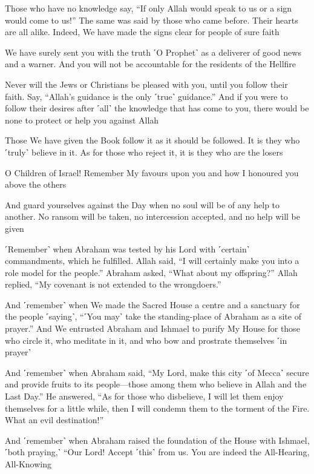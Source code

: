 Those who have no knowledge say, “If only Allah would speak to us or a sign would come to us!” The same was said by those who came before. Their hearts are all alike. Indeed, We have made the signs clear for people of sure faith

We have surely sent you with the truth ˹O Prophet˺ as a deliverer of good news and a warner. And you will not be accountable for the residents of the Hellfire

Never will the Jews or Christians be pleased with you, until you follow their faith. Say, “Allah’s guidance is the only ˹true˺ guidance.” And if you were to follow their desires after ˹all˺ the knowledge that has come to you, there would be none to protect or help you against Allah

Those We have given the Book follow it as it should be followed. It is they who ˹truly˺ believe in it. As for those who reject it, it is they who are the losers

O Children of Israel! Remember My favours upon you and how I honoured you above the others

And guard yourselves against the Day when no soul will be of any help to another. No ransom will be taken, no intercession accepted, and no help will be given

˹Remember˺ when Abraham was tested by his Lord with ˹certain˺ commandments, which he fulfilled. Allah said, “I will certainly make you into a role model for the people.” Abraham asked, “What about my offspring?” Allah replied, “My covenant is not extended to the wrongdoers.”

And ˹remember˺ when We made the Sacred House a centre and a sanctuary for the people ˹saying˺, “˹You may˺ take the standing-place of Abraham as a site of prayer.” And We entrusted Abraham and Ishmael to purify My House for those who circle it, who meditate in it, and who bow and prostrate themselves ˹in prayer˺

And ˹remember˺ when Abraham said, “My Lord, make this city ˹of Mecca˺ secure and provide fruits to its people—those among them who believe in Allah and the Last Day.” He answered, “As for those who disbelieve, I will let them enjoy themselves for a little while, then I will condemn them to the torment of the Fire. What an evil destination!”

And ˹remember˺ when Abraham raised the foundation of the House with Ishmael, ˹both praying,˺ “Our Lord! Accept ˹this˺ from us. You are indeed the All-Hearing, All-Knowing

